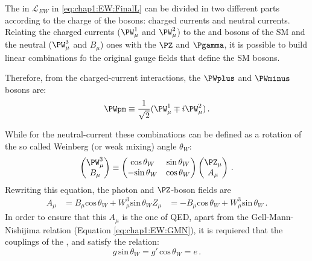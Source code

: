 The in $\mathcal{L}_{EW}$ in \ref{eq:chap1:EW:FinalL} can be divided in two different parts according 
to the charge of the bosons: charged currents and neutral currents.
Relating the charged currents ($\PW^{1}_{\mu}$ and $\PW^{2}_{\mu}$) to the \PWplus and \PWminus 
bosons of the SM and the neutral ($\PW^{3}_{\mu}$ and $B_\mu$) ones with the $\PZ$ and $\Pgamma$, 
it is possible to build linear combinations fo the original gauge fields that define the SM bosons.


Therefore, from the charged-current interactions, the $\PWplus$ and $\PWminus$ bosons 
are:
\begin{equation}
	\PWpm \equiv \frac{1}{\sqrt{2}}(\PW^{1}_{\mu} \mp i\PW^{2}_{\mu})\, .
\end{equation}

While for the neutral-current these combinations can be defined as a rotation of the so called Weinberg 
(or weak mixing) angle $\theta_{W}$:
\begin{equation*}\label{eq:chap1:EW:ZmuAmu}
		\begin{pmatrix} \PW_{\mu}^3 \\ B_\mu \end{pmatrix} \equiv
		\begin{pmatrix} \textrm{cos} \,\theta_{W} & \textrm{sin} \,\theta_{W} \\  -\textrm{sin} \,\theta_{W} & \textrm{cos}\, \theta_{W} \end{pmatrix} \begin{pmatrix} \PZ_{\mu} \\ A_{\mu} \end{pmatrix} \, .
\end{equation*}
Rewriting this equation, the photon and $\PZ$-boson fields are 
\begin{align}
	A_{\mu}	&= B_{\mu} \textrm{cos} \,\theta_{W}+ W^{3}_{\mu}  \textrm{sin} \,\theta_{W}
	Z_{\mu}	&= -B_{\mu} \textrm{cos} \,\theta_{W}+ W^{3}_{\mu}  \textrm{sin} \,\theta_{W} \, .
\end{align}
In order to ensure that this $A_{\mu}$ is the one of QED, apart from the Gell-Mann-Nishijima relation (Equation
\ref{eq:chap1:EW:GMN}), it is requiered that the couplings of the \Pgamma, \PWpm and \PZ satisfy the relation:
\begin{equation}
	g \, \textrm{sin} \,\theta_{W} = g' \,\textrm{cos}\, \theta_{W} = e \, .
\end{equation}


